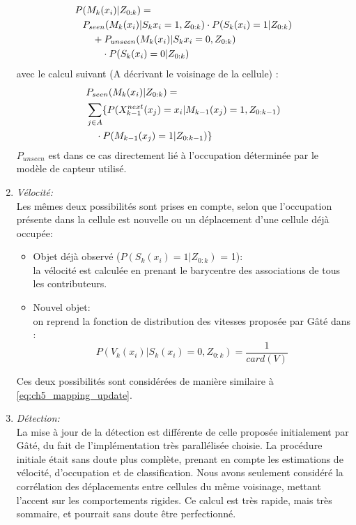 \begin{enumerate}
	\begin{align} \label{eq:ch5_mapping_update}
		P &(M_k(x_i)| Z_{0:k}) = \notag \\
		& P_{seen}(M_k(x_i)| S_k{x_i} = 1, Z_{0:k}) \cdot P(S_k(x_i)=1 | Z_{0:k}) \notag \\
		& \quad + P_{unseen}(M_k(x_i)|S_k{x_i}=0,Z_{0:k}) \notag \\
		& \quad \quad \cdot P(S_k(x_i)=0 | Z_{0:k})
	\end{align}
	avec le calcul suivant (A décrivant le voisinage de la cellule) :
	\begin{align}
		&P_{seen}(M_k(x_i) | Z_{0:k}) = \notag \\
		& \sum_{j \in A}  \lbrace P(X_{k-1}^{next}(x_j)=x_i|M_{k-1}(x_j)=1,Z_{0:k-1}) \notag \\
		& \quad \cdot P(M_{k-1}(x_j)=1|Z_{0:k-1}) \rbrace 
	\end{align}
	$P_{unseen}$ est dans ce cas directement lié à l'occupation déterminée par le modèle de capteur utilisé.\\
	
	\item{\emph{Vélocité:\\}}
	Les mêmes deux possibilités sont prises en compte, selon que l'occupation présente dans la cellule est nouvelle ou un déplacement d'une cellule déjà occupée: 
	\begin{itemize}
		\item{Objet déjà observé ($P(S_k(x_i)=1 | Z_{0:k})$ = 1):\\}
		la vélocité est calculée en prenant le barycentre des associations de tous les contributeurs.\\
		
		\item{Nouvel objet:\\}
		on reprend la fonction de distribution des vitesses proposée par Gâté dans \cite{Gate2009} :
		\begin{equation}
		P(V_k(x_i) | S_k(x_i) = 0, Z_{0:k}) = \frac{1}{card(V)}
		\end{equation}
	\end{itemize}
	Ces deux possibilités sont considérées de manière similaire à \ref{eq:ch5_mapping_update}.\\
	
	\item{\emph{Détection:\\}}
	La mise à jour de la détection est différente de celle proposée initialement par Gâté, du fait de l'implémentation très parallélisée choisie. La procédure initiale était sans doute plus complète, prenant en compte les estimations de vélocité, d'occupation et de classification. Nous avons seulement considéré la corrélation des déplacements entre cellules du même voisinage, mettant l'accent sur les comportements rigides. Ce calcul est très rapide, mais très sommaire, et pourrait sans doute être perfectionné.\\
	

\end{enumerate}
